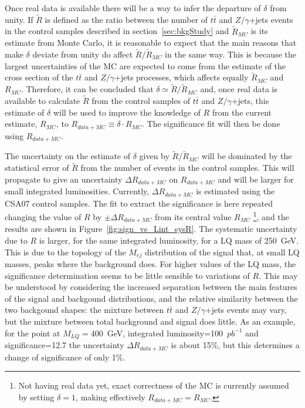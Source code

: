 Once real data is available there will be a way to infer the departure of $\delta$ from unity.
If $\tilde{R}$ is defined as the ratio between the number of $t\bar{t}$ and $Z/\gamma$+jets events in the
control samples described in section~\ref{sec:bkgStudy} and $\tilde{R}_{MC}$ is its
estimate from Monte Carlo, it is reasonable to expect that the main reasons that
make $\delta$ deviate from unity do affect $\tilde{R}/\tilde{R}_{MC}$ in the same way.
This is because the largest uncertainties of the MC are expected to come from the estimate 
of the cross section of the $t\bar{t}$ and $Z/\gamma$+jets processes, 
which affects equally $\tilde{R}_{MC}$ and $R_{MC}$.
Therefore, it can be concluded that $\delta \simeq \tilde{R}/\tilde{R}_{MC}$ and, once real data is available
to calculate $\tilde{R}$ from the control samples of $t\bar{t}$ and $Z/\gamma$+jets, this estimate 
of $\delta$ will be used to improve the knowledge of $R$ from the current estimate, $R_{MC}$, 
to $R_{data+MC} \equiv \delta \cdot R_{MC}$.
The significance fit will then be done using $R_{data+MC}$. 

The uncertainty on the estimate of $\delta$ given by $\tilde{R}/\tilde{R}_{MC}$ will be 
dominated by the statistical error of $\tilde{R}$ from the number of events in the control samples. 
This will propagate to give an uncertainty $\Delta R_{data+MC}$ on $R_{data+MC}$ and will
be larger for small integrated luminosities. 
Currently, $\Delta R_{data+MC}$ is estimated using the CSA07 control samples.
The fit to extract the significance is here repeated changing the value of $R$ by 
$\pm\Delta R_{data+MC}$ from its central value $R_{MC}$ \footnote{Not having real data yet, 
exact correctness of the MC is currently assumed by setting $\delta=1$, 
making effectively $R_{data+MC}=R_{MC}$.}, and the results are shown in 
Figure~\ref{fig:sign_vs_Lint_sysR}.
The systematic uncertainty due to $R$ is larger, for the same integrated luminosity, for a
LQ mass of 250~GeV. This is due to the topology of the $M_{ej}$ distribution 
of the signal that, at small LQ masses, peaks where the background does.
For higher values of the LQ mass, the significance determination seems to be little 
sensible to variations of $R$. This may be understood by considering the increased separation
between the main features of the signal and backgound distributions, and the relative similarity 
between the two backgound shapes: 
the mixture between $t\bar{t}$ and $Z/\gamma$+jets events may vary, but
the mixture between total background and signal does little.
As an example, for the point at $M_{LQ}=400$~GeV, integrated luminosity=100~$pb^{-1}$ and significance=12.7
the uncertainty  $\Delta R_{data+MC}$ is about 15\%, but this determines a change of 
significance of only 1\%.

